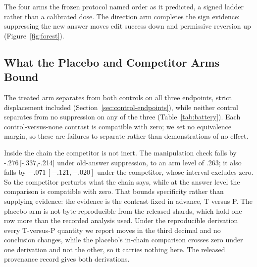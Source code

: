 \documentclass[letterpaper]{article} %
\begin{document}
The four arms the frozen protocol named order as it predicted, a signed ladder rather than a calibrated dose.  The direction arm completes the sign evidence: suppressing the new answer moves edit success down and permissive reversion up (Figure~\ref{fig:forest}).

\subsection{What the Placebo and Competitor Arms Bound}
\label{sec:control-controls}

The treated arm separates from both controls on all three endpoints, strict displacement included (Section~\ref{sec:control-endpoints}), while neither control separates from no suppression on any of the three (Table~\ref{tab:battery}).  Each control-versus-none contrast is compatible with zero; we set no equivalence margin, so these are failures to separate rather than demonstrations of no effect.

Inside the chain the competitor is not inert.  The manipulation check falls by -.276\,[-.337,-.214] under old-answer suppression, to an arm level of .263; it also falls by \(-.071\,[-.121,-.020]\) under the competitor, whose interval excludes zero.  So the competitor perturbs what the chain says, while at the answer level the comparison is compatible with zero.  That bounds specificity rather than supplying evidence: the evidence is the contrast fixed in advance, T versus P.  The placebo arm is not byte-reproducible from the released shards, which hold one row more than the recorded analysis used.  Under the reproducible derivation every T-versus-P quantity we report moves in the third decimal and no conclusion changes, while the placebo's in-chain comparison crosses zero under one derivation and not the other, so it carries nothing here.  The released provenance record gives both derivations.  %
\end{document}
